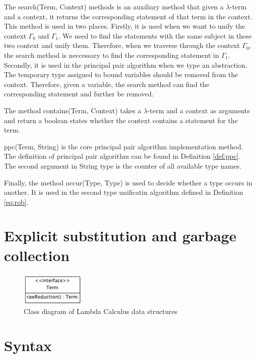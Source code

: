 The \textsf{search(Term, Context)} methods is an auxiliary method that given a $\lambda$-term and a context, it returns the corresponding statement of that term in the context. This method is used in two places. Firstly, it is used when we want to unify the context $\Gamma_0$ and $\Gamma_1$. We need to find the statements with the same subject in these two context and unify them. Therefore, when we traverse through the context $\Gamma_0$, the search method is neccessary to find the corresponding statement in $\Gamma_1$. Secondly, it is used in the principal pair algorithm when we type an abstraction. The temporary type assigned to bound variables should be removed from the context. Therefore, given a variable, the search method can find the corresponding statement and further be removed.  

The method \textsf{contains(Term, Context)} takes a $\lambda$-term and a context as arguments and return a boolean states whether the context contains a statement for the term.

\textsf{ppc(Term, String)} is the core principal pair algorithm implementation method. The definition of principal pair algorithm can be found in Definition \ref{def:ppc}. The second argument in \textsf{String} type is the counter of all available type names. 

Finally, the method \textsf{occur(Type, Type)} is used to decide whether a type occurs in another. It is used in the second type unificatin algorithm defined in Definition \ref{eq:rob}.

\section{Explicit substitution and garbage collection}

\begin{figure}[ht]
\centering
\includegraphics[scale=0.7]{pics/TermRaw}
\caption{Class diagram of Lambda Calculus data structures}
\label{fig:termraw}
\end{figure}
\section{Syntax}
